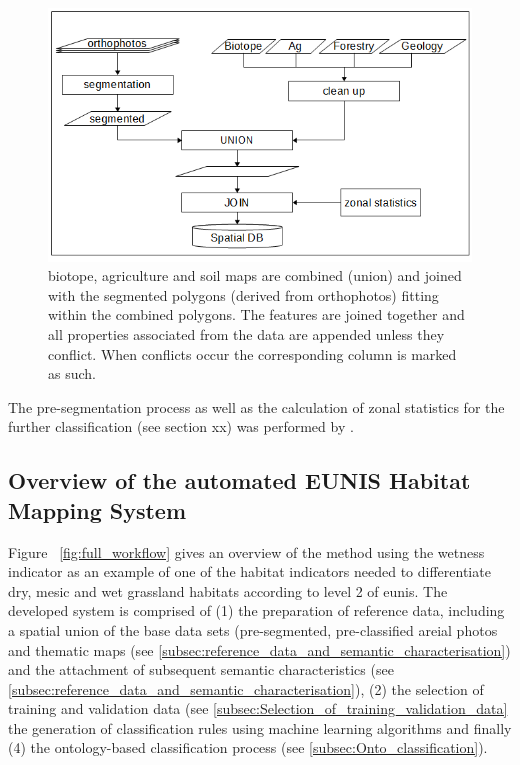 \documentclass[authoryear,final,12pt,number]{elsarticle}
\begin{document}
\begin{figure} \includegraphics[width=1\textwidth]{diagrams/pre_processing.png}
    \caption{biotope, agriculture and soil maps are combined 
    (union) and joined with the segmented polygons (derived from 
    orthophotos) fitting within the combined polygons. The features are joined 
    together and all properties associated from the data are appended unless 
    they conflict. When conflicts occur the corresponding column is marked as 
    such.\label{fig:pre-processing}}
\end{figure}
The pre-segmentation process as well as the calculation of zonal statistics
for the further classification (see section xx) was performed by
\citep{Tintrup2015}.
\label{subsec:method_overview}




\subsection{Overview of the automated EUNIS Habitat Mapping System}
Figure ~\ref{fig:full_workflow} gives an overview of the method using the
wetness indicator as an example of one of the habitat indicators needed to
differentiate dry, mesic and wet grassland habitats according to level 2 of
\gls{eunis}. The developed system is comprised of (1) the preparation of 
reference
data, including a spatial union of the base data sets (pre-segmented,
pre-classified areial photos and thematic maps (see
\ref{subsec:reference_data_and_semantic_characterisation}) and the attachment of
subsequent semantic characteristics (see 
\ref{subsec:reference_data_and_semantic_characterisation}), (2)
the selection of training and validation data (see
\ref{subsec:Selection_of_training_validation_data} the generation of
classification rules using machine learning algorithms and finally (4) the
ontology-based classification process (see \ref{subsec:Onto_classification}). 
\end{document}
